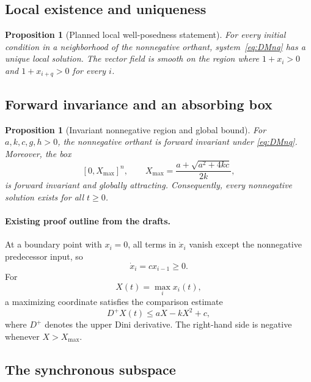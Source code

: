 \documentclass[11pt, reqno]{amsart}
\newtheorem{proposition}[theorem]{Proposition}
\theoremstyle{definition}
\theoremstyle{remark}
\begin{document}
\subsection{Local existence and uniqueness}

\begin{proposition}[Planned local well-posedness statement]
For every initial condition in a neighborhood of the nonnegative orthant,
system~\eqref{eq:DMnq} has a unique local solution.  The vector field is smooth
on the region where $1+x_i>0$ and $1+x_{i+q}>0$ for every $i$.
\end{proposition}


\subsection{Forward invariance and an absorbing box}

\begin{proposition}[Invariant nonnegative region and global bound]
\label{prop:absorbing-box}
For $a,k,c,g,h>0$, the nonnegative orthant is forward invariant under
\eqref{eq:DMnq}.  Moreover, the box
\[
    [0,X_{\max}]^n,
    \qquad
    X_{\max}=\frac{a+\sqrt{a^2+4kc}}{2k},
\]
is forward invariant and globally attracting.  Consequently, every
nonnegative solution exists for all $t\ge0$.
\end{proposition}

\paragraph{Existing proof outline from the drafts.}
At a boundary point with $x_i=0$, all terms in $\dot x_i$ vanish except the
nonnegative predecessor input, so
\[
    \dot x_i=cx_{i-1}\ge0.
\]
For
\[
    X(t)=\max_i x_i(t),
\]
a maximizing coordinate satisfies the comparison estimate
\[
    D^+X(t)\le aX-kX^2+c,
\]
where $D^+$ denotes the upper Dini derivative.  The right-hand side is negative
whenever $X>X_{\max}$.


\subsection{The synchronous subspace}
\end{document}
